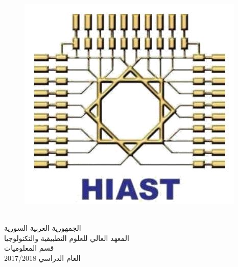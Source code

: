 

	\thispagestyle{empty}
	
	\newfontfamily{}
	\newfontfamily{}
	
	{
		\begin{figure}
			\hfill
			\includegraphics[width=0.9\linewidth]{images/HIAST_logo.JPG}
		\end{figure}
			
		\coverfont
		\begin{spacing}{1.8}
			\ \\
			الجمهورية العربية السورية \\
			المعهد العالي للعلوم التطبيقية والتكنولوجيا \\
			قسم المعلوميات \\
			العام الدراسي 2017/2018  \\
		\end{spacing}
	}
	
